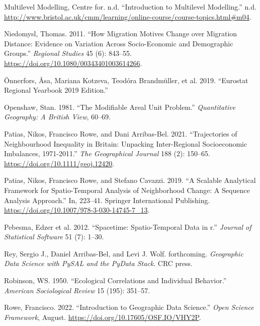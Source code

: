 \documentclass[
  letterpaper,
  krantz2]{style/krantz}
\newlength{\cslhangindent}
\newlength{\cslentryspacingunit} %
\newenvironment{CSLReferences}[2] %
 {%
  \setlength{\parindent}{0pt}
  \ifodd #1
  \let\oldpar\par
  \def\par{\hangindent=\cslhangindent\oldpar}
  \fi
  \setlength{\parskip}{#2\cslentryspacingunit}
 }%
 {}
\begin{document}
\begin{CSLReferences}{1}{0}
\leavevmode{}%
Multilevel Modelling, Centre for. n.d. {``Introduction to Multilevel
Modelling.''} n.d.
\url{http://www.bristol.ac.uk/cmm/learning/online-course/course-topics.html\#m04}.

\leavevmode{}%
Niedomysl, Thomas. 2011. {``How Migration Motives Change over Migration
Distance: Evidence on Variation Across Socio-Economic and Demographic
Groups.''} \emph{Regional Studies} 45 (6): 843--55.
\url{https://doi.org/10.1080/00343401003614266}.

\leavevmode{}%
Önnerfors, Åsa, Mariana Kotzeva, Teodóra Brandmüller, et al. 2019.
{``Eurostat Regional Yearbook 2019 Edition.''}

\leavevmode{}%
Openshaw, Stan. 1981. {``The Modifiable Areal Unit Problem.''}
\emph{Quantitative Geography: A British View}, 60--69.

\leavevmode{}%
Patias, Nikos, Francisco Rowe, and Dani Arribas-Bel. 2021.
{``Trajectories of Neighbourhood Inequality in Britain: Unpacking
Inter{-}Regional Socioeconomic Imbalances, 1971{-}2011.''} \emph{The
Geographical Journal} 188 (2): 150--65.
\url{https://doi.org/10.1111/geoj.12420}.

\leavevmode{}%
Patias, Nikos, Francisco Rowe, and Stefano Cavazzi. 2019. {``A Scalable
Analytical Framework for Spatio-Temporal Analysis of Neighborhood
Change: A Sequence Analysis Approach.''} In, 223--41. Springer
International Publishing.
\url{https://doi.org/10.1007/978-3-030-14745-7_13}.

\leavevmode{}%
Pebesma, Edzer et al. 2012. {``Spacetime: Spatio-Temporal Data in r.''}
\emph{Journal of Statistical Software} 51 (7): 1--30.

\leavevmode{}%
Rey, Sergio J., Daniel Arribas-Bel, and Levi J. Wolf. forthcoming.
\emph{Geographic Data Science with PySAL and the PyData Stack}. CRC
press.

\leavevmode{}%
Robinson, WS. 1950. {``Ecological Correlations and Individual
Behavior.''} \emph{American Sociological Review} 15 (195): 351--57.

\leavevmode{}%
Rowe, Francisco. 2022. {``Introduction to Geographic Data Science.''}
\emph{Open Science Framework}, August.
\url{https://doi.org/10.17605/OSF.IO/VHY2P}.


\end{CSLReferences}
\end{document}
